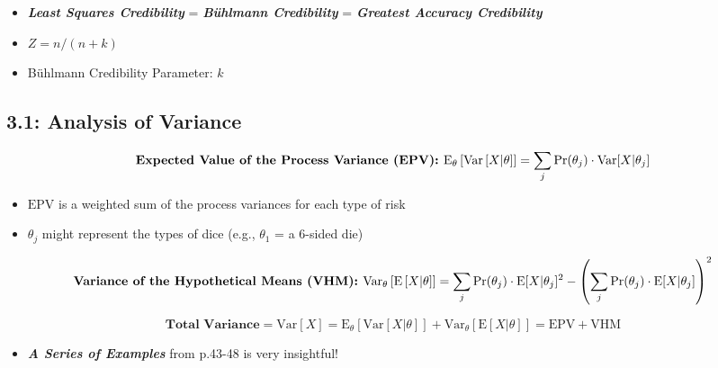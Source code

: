 \documentclass[
]{article}
\providecommand{\tightlist}{%
  \setlength{\itemsep}{0pt}\setlength{\parskip}{0pt}}
\begin{document}
\begin{itemize}
\item
  \textbf{\emph{Least Squares Credibility}} = \textbf{\emph{Bühlmann
  Credibility}} = \textbf{\emph{Greatest Accuracy Credibility}}
\item
  \(Z = n/(n+k)\)
\item
  Bühlmann Credibility Parameter: \(k\)
\end{itemize}

\hypertarget{analysis-of-variance}{%
\subsection{3.1: Analysis of Variance}\label{analysis-of-variance}}

\begin{yellow}

\[
  \textbf{Expected Value of the Process Variance (EPV): } \\ \text{E}_\theta\left[\text{Var}\left[X|\theta\right]\right] = \sum_{j} \Pr(\theta_j) \cdot \text{Var}[X|\theta_j]
\]

\begin{itemize}
\item
  \(\text{EPV}\) is a weighted sum of the process variances for each
  type of risk
\item
  \(\theta_j\) might represent the types of dice (e.g., \(\theta_1\) = a
  6-sided die)
\end{itemize}

\end{yellow}

\begin{yellow}

\[
  \textbf{Variance of the Hypothetical Means (VHM): } \\ \text{Var}_\theta\left[\text{E}\left[X|\theta\right]\right] = \sum_{j} \Pr(\theta_j) \cdot \text{E}[X|\theta_j]^2 - \left( \sum_{j} \Pr(\theta_j) \cdot \text{E}[X|\theta_j] \right)^2
\]

\end{yellow}

\begin{yellow}

\[
  \textbf{Total Variance} = \text{Var}[X] =\text{E}_\theta\left[\text{Var}\left[X|\theta\right]\right] + \text{Var}_\theta\left[\text{E}\left[X|\theta\right]\right] = \text{EPV} + \text{VHM}
\]

\end{yellow}

\begin{itemize}
\tightlist
\item
  \textbf{\emph{A Series of Examples}} from p.43-48 is very insightful!
\end{itemize}
\end{document}
